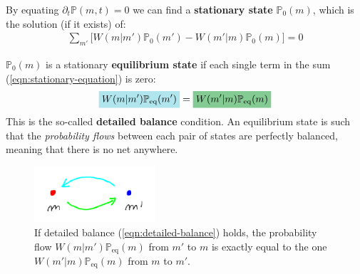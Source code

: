 \documentclass[../../main.tex]{subfiles}
\begin{document}
By equating $\partial_t \mathbb{P}(m,t) = 0$ we can find a \textbf{stationary state} $\mathbb{P}_0(m)$, which is the solution (if it exists) of:
\begin{align}\label{eqn:stationary-equation}
    \sum_{m'} \Big[W(m|m') \mathbb{P}_0(m') - W(m'|m) \mathbb{P}_0(m)\Big]  = 0
\end{align} 

$\mathbb{P}_0(m)$ is a stationary \textbf{equilibrium state} if each single term in the sum (\ref{eqn:stationary-equation}) is zero:
\begin{align}\label{eqn:detailed-balance}
    \hlc{SkyBlue}{W(m|m') \mathbb{P}_{\mathrm{eq}}(m')} = \hlc{ForestGreen}{W(m'|m) \mathbb{P}_{\mathrm{eq}}(m)} 
\end{align}
This is the so-called \textbf{detailed balance} condition. An equilibrium state is such that the \textit{probability flows} between each pair of states are perfectly balanced, meaning that there is no net  anywhere. 

\begin{figure}[H]
    \centering
    \includegraphics[width=0.4\textwidth]{detailed-balance.png}
    \caption{If detailed balance (\ref{eqn:detailed-balance}) holds, the probability flow $W(m|m')\mathbb{P}_{\mathrm{eq}}(m)$ from $m'$ to $m$ is exactly equal to the one $W(m'|m)\mathbb{P}_{\mathrm{eq}}(m)$ from $m$ to $m'$.}
    \label{fig:detailed-balance}
\end{figure}
\end{document}

